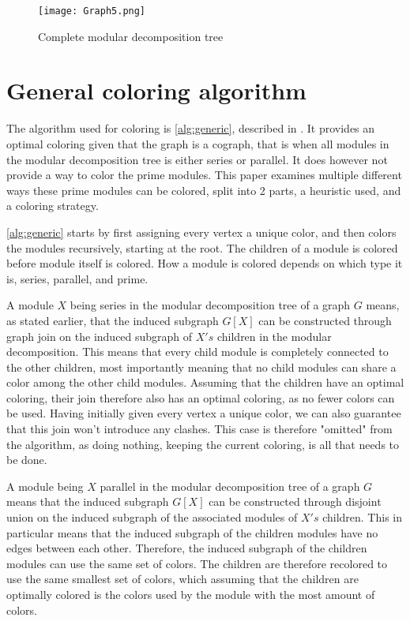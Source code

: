 \documentclass[a4paper]{article}
\begin{document}
\begin{figure}[h!]
    \texttt{[image: Graph5.png]}
    \caption{Complete modular decomposition tree}
    \label{fig:graph5}
\end{figure}

\FloatBarrier

\section{General coloring algorithm}

The algorithm used for coloring is \autoref{alg:generic}, described in
\cite{HCL}. It provides an optimal coloring given that the graph is a cograph,
that is when all modules in the modular decomposition tree is either series or
parallel.  It does however not provide a way to color the prime modules. This
paper examines multiple different ways these prime modules can be colored, split
into 2 parts, a heuristic used, and a coloring strategy. 

\autoref{alg:generic} starts by first assigning every vertex a unique color,
and then colors the modules recursively, starting at the root. The children of a
module is colored before module itself is colored. How a module is colored depends 
on which type it is, series, parallel, and prime.

A module $X$ being series in the modular decomposition tree of a graph $G$
means, as stated earlier, that the induced subgraph $G[X]$ can be
constructed through graph join on the induced subgraph of $X's$ children in the
modular decomposition. This means that every child module is completely
connected to the other children, most importantly meaning that no child modules
can share a color among the other child modules. Assuming that the children
have an optimal coloring, their join therefore also has an optimal coloring, as
no fewer colors can be used. Having initially given every vertex a unique
color, we can also guarantee that this join won't introduce any clashes. This
case is therefore "omitted" from the algorithm, as doing nothing, keeping the
current coloring, is all that needs to be done.

A module being $X$ parallel in the modular decomposition tree of a graph $G$ means that
the induced subgraph $G[X]$ can be constructed through disjoint union on the induced
subgraph of the associated modules of $X's$ children. This in particular means that 
the induced subgraph of the children modules have no edges between each other. Therefore,
the induced subgraph of the children modules can use the same set of colors. The children
are therefore recolored to use the same smallest set of colors, 
which assuming that the children are optimally colored is the colors used by the module 
with the most amount of colors.
\end{document}
